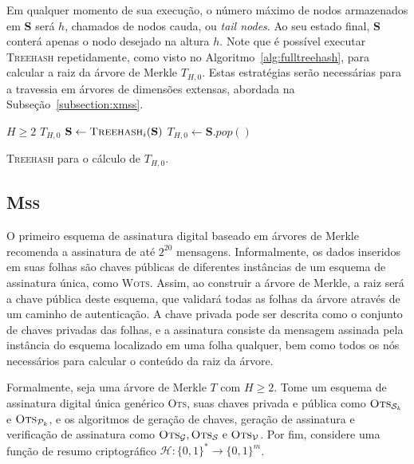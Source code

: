 \documentclass{ufsctex/ufsctex}
\newcommand{\hh}{\mathcal{H}}
\newcommand{\pk}{\mathcal{P}_k}
\newcommand{\sk}{\mathcal{S}_k}
\newcommand{\binwds}[1]{\{0, 1\}^{#1}}
\newcommand{\fhash}[1]{\hh{}: \binwds{*} \longrightarrow{} \binwds{#1}}
\newcommand{\wots}{\textsc{Wots}}
\newcommand{\mss}{\textsc{Mss}}
\begin{document}
Em qualquer momento de sua execução, o número máximo de nodos armazenados em
\textbf{S} será $h$, chamados de nodos cauda, ou \emph{tail nodes}. Ao seu
estado final, \textbf{S} conterá apenas o nodo desejado na altura $h$. Note que
é possível executar \textsc{Treehash} repetidamente, como visto no
Algoritmo~\ref{alg:fulltreehash}, para calcular a raiz da árvore de Merkle
$T_{H, 0}$. Estas estratégias serão necessárias para a travessia em árvores de
dimensões extensas, abordada na Subseção~\ref{subsection:xmss}.

\begin{algorithm}
  \begin{algorithmic}
    \REQUIRE{} {$H \geq 2$} 
    \ENSURE{} {$T_{H, 0}$} 
      \STATE{}  $\mathbf{S} \leftarrow \textsc{Treehash}_{i}(\mathbf{S})$
    \ENDFOR{}
    \STATE{}  $T_{H, 0} \leftarrow \mathbf{S}.pop()$
  \end{algorithmic}
  \caption{\textsc{Treehash} para o
    cálculo de $T_{H, 0}$.}\label{alg:fulltreehash}
\end{algorithm}

\subsection{\mss{}}\label{subsection:mss}

O primeiro esquema de assinatura digital baseado em árvores de
Merkle~\cite[Capítulo 6]{Merkle:inproc:1989:aug} recomenda a assinatura de até
$2^{20}$ mensagens. Informalmente, os dados inseridos em suas folhas são chaves
públicas de diferentes instâncias de um esquema de assinatura única, como
\wots{}. Assim, ao construir a árvore de Merkle, a raiz será a chave pública
deste esquema, que validará todas as folhas da árvore através de um caminho de
autenticação. A chave privada pode ser descrita como o conjunto de chaves
privadas das folhas, e a assinatura consiste da mensagem assinada pela
instância do esquema localizado em uma folha qualquer, bem como todos os nós
necessários para calcular o conteúdo da raiz da árvore.

Formalmente, seja uma árvore de Merkle $T$ com $H \geq 2$. Tome um esquema de
assinatura digital única genérico \textsc{Ots}, suas chaves privada e pública
como $\textsc{Ots}_{\sk{}}$ e $\textsc{Ots}_{\pk{}}$, e os algoritmos de
geração de chaves, geração de assinatura e verificação de assinatura como
$\textsc{Ots}_\mathcal{G}, \textsc{Ots}_\mathcal{S} \text{ e }
\textsc{Ots}_\mathcal{V}$. Por fim, considere uma função de resumo
criptográfico $\fhash{m}$.
\end{document}
